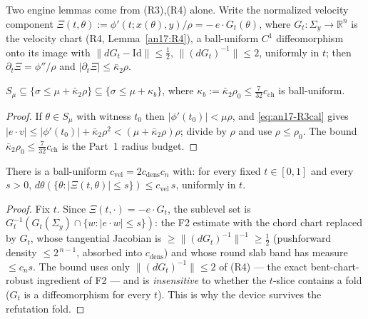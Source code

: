 Two engine lemmas come from (R3),(R4) alone. Write the normalized velocity
component $\Xi(t,\theta):=\phi'(t;x(\theta),y)/\rho=-\,e\cdot G_t(\theta)$, where
$G_t:\Sigma_y\to\mathbb R^n$ is the velocity chart (R4, Lemma~\ref{an17:R4}), a
ball-uniform $C^1$ diffeomorphism onto its image with
$\|dG_t-\mathrm{Id}\|\le\tfrac12$, $\|(dG_t)^{-1}\|\le2$, uniformly in $t$; then
$\partial_t\Xi=\phi''/\rho$ and $|\partial_t\Xi|\le\bar\kappa_2\rho$.

\begin{lemma}\label{an17:lem-conf}
$S_\mu\subseteq\{\sigma\le\mu+\bar\kappa_2\rho\}\subseteq\{\sigma\le\mu+\kappa_b\}$,
where $\kappa_b:=\bar\kappa_2\rho_0\le\tfrac7{32}c_{\mathrm{ch}}$ is ball-uniform.
\end{lemma}
\begin{proof}
If $\theta\in S_\mu$ with witness $t_0$ then $|\phi'(t_0)|<\mu\rho$, and
\eqref{eq:an17-R3cal} gives $|e\cdot v|\le|\phi'(t_0)|+\bar\kappa_2\rho^2<
(\mu+\bar\kappa_2\rho)\rho$; divide by $\rho$ and use $\rho\le\rho_0$. The bound
$\bar\kappa_2\rho_0\le\tfrac7{32}c_{\mathrm{ch}}$ is the Part~1 radius budget.
\end{proof}

\begin{lemma}\label{an17:lem-vel}
There is a ball-uniform $c_{\mathrm{vel}}=2c_{\mathrm{dens}}c_n$ with: for every
fixed $t\in[0,1]$ and every $s>0$,
$d\theta(\{\theta:|\Xi(t,\theta)|\le s\})\le c_{\mathrm{vel}}\,s$, uniformly
in $t$.
\end{lemma}
\begin{proof}
Fix $t$. Since $\Xi(t,\cdot)=-e\cdot G_t$, the sublevel set is
$G_t^{-1}(G_t(\Sigma_y)\cap\{w:|e\cdot w|\le s\})$: the F2 estimate with the
chord chart replaced by $G_t$, whose tangential Jacobian is
$\ge\|(dG_t)^{-1}\|^{-1}\ge\tfrac12$ (pushforward density $\le2^{\,n-1}$,
absorbed into $c_{\mathrm{dens}}$) and whose round slab band has measure
$\le c_ns$. The bound uses only $\|(dG_t)^{-1}\|\le2$ of (R4) --- the exact
bent-chart-robust ingredient of F2 --- and is \emph{insensitive} to whether the
$t$-slice contains a fold ($G_t$ is a diffeomorphism for every $t$). This is why
the device survives the refutation fold.
\end{proof}

